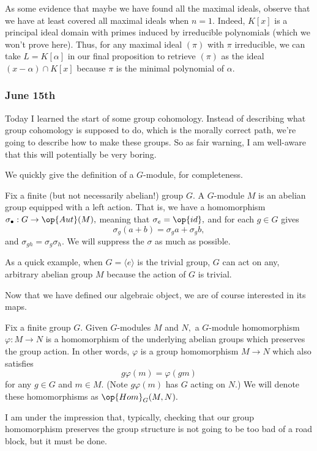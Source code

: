 As some evidence that maybe we have found all the maximal ideals, observe that we have at least covered all maximal ideals when $n=1.$ Indeed, $K[x]$ is a principal ideal domain with primes induced by irreducible polynomials (which we won't prove here). Thus, for any maximal ideal $(\pi)$ with $\pi$ irreducible, we can take $L=K[\alpha]$ in our final proposition to retrieve $(\pi)$ as the ideal $(x-\alpha)\cap K[x]$ because $\pi$ is the minimal polynomial of $\alpha.$

\subsubsection{June 15th}
Today I learned the start of some group cohomology. Instead of describing what group cohomology is supposed to do, which is the morally correct path, we're going to describe how to make these groups. So as fair warning, I am well-aware that this will potentially be very boring.

We quickly give the definition of a $G$-module, for completeness.
\begin{definition}
    Fix a finite (but not necessarily abelian!) group $G.$ A $G$-module $M$ is an abelian group equipped with a left action. That is, we have a homomorphism $\sigma_\bullet:G\to\op{Aut}(M),$ meaning that $\sigma_e=\op{id},$ and for each $g\in G$ gives
    \[\sigma_g(a+b)=\sigma_ga+\sigma_gb,\]
    and $\sigma_{gh}=\sigma_g\sigma_h.$ We will suppress the $\sigma$ as much as possible.
\end{definition}
As a quick example, when $G=\langle e\rangle$ is the trivial group, $G$ can act on any, arbitrary abelian group $M$ because the action of $G$ is trivial.

Now that we have defined our algebraic object, we are of course interested in its maps.
\begin{definition}
    Fix a finite group $G.$ Given $G$-modules $M$ and $N,$ a $G$-module homomorphism $\varphi:M\to N$ is a homomorphism of the underlying abelian groups which preserves the group action. In other words, $\varphi$ is a group homomorphism $M\to N$ which also satisfies
    \[g\varphi(m)=\varphi(gm)\]
    for any $g\in G$ and $m\in M.$ (Note $g\varphi(m)$ has $G$ acting on $N.$) We will denote these homomorphisms as $\op{Hom}_G(M,N).$
\end{definition}
I am under the impression that, typically, checking that our group homomorphism preserves the group structure is not going to be too bad of a road block, but it must be done.

